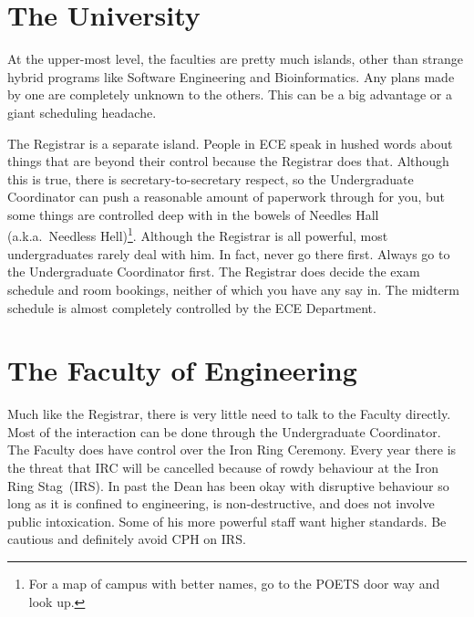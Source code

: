 \documentclass{book}
\begin{document}
\section{The University}
At the upper-most level, the faculties are pretty much islands, other than strange hybrid programs like Software Engineering and Bioinformatics. Any plans made by one are completely unknown to the others. This can be a big advantage or a giant scheduling headache.


The Registrar is a separate island. People in ECE speak in hushed words about things that are beyond their control because the Registrar does that. Although this is true, there is secretary-to-secretary respect, so the Undergraduate Coordinator can push a reasonable amount of paperwork through for you, but some things are controlled deep with in the bowels of Needles Hall\,(a.k.a.~Needless Hell)\footnote{For a map of campus with better names, go to the POETS door way and look up.}. Although the Registrar is all powerful, most undergraduates rarely deal with him. In fact, never go there first. Always go to the Undergraduate Coordinator first. The Registrar does decide the exam schedule and room bookings, neither of which you have any say in. The midterm schedule is almost completely controlled by the ECE Department.

\section{The Faculty of Engineering}
Much like the Registrar, there is very little need to talk to the Faculty directly. Most of the interaction can be done through the Undergraduate Coordinator. The Faculty does have control over the Iron Ring Ceremony. Every year there is the threat that IRC will be cancelled because of rowdy behaviour at the Iron Ring Stag~(IRS). In past the Dean has been okay with disruptive behaviour so long as it is confined to engineering, is non-destructive, and does not involve public intoxication. Some of his more powerful staff want higher standards. Be cautious and definitely avoid CPH on IRS.
\end{document}
